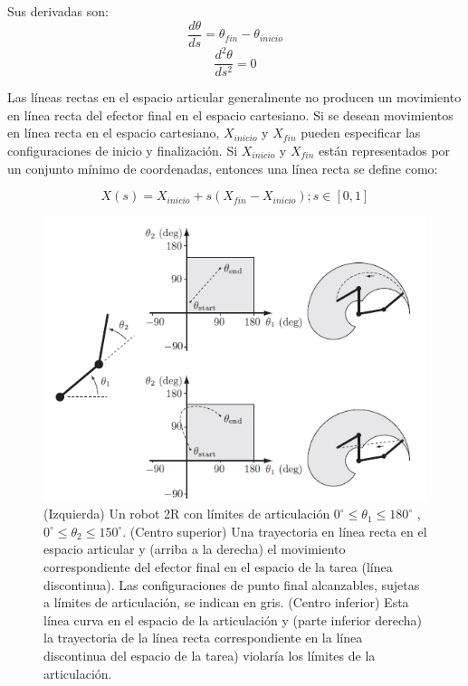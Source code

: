             Sus derivadas son:
            \begin{equation}
                \frac{d\theta}{ds}=\theta_{fin}-\theta_{inicio}
                \label{eq:cap4_tray_10}
             \end{equation}      
            \begin{equation}
                \frac{d^2\theta}{ds^2}=0
                \label{eq:cap4_tray_11}
             \end{equation}  
            
            Las líneas rectas en el espacio articular generalmente no producen un movimiento en línea recta del efector final en el espacio cartesiano. Si se desean movimientos en línea recta en el espacio cartesiano, $X_{inicio}$ y $X_{fin}$ pueden especificar las configuraciones de inicio y finalización. Si $X_{inicio}$ y $X_{fin}$ están representados por un conjunto mínimo de coordenadas, entonces una línea recta se define como:
            
            \begin{equation}
                X(s)= X_{inicio} + s(X_{fin}-X_{inicio}) ; s \in [0,1]
                \label{eq:cap4_tray_12}
             \end{equation}    
                
            \begin{figure}[htb]
                \centering
                \includegraphics[width=1\linewidth]{Main/Chapter4/Images4/cap4_tray_7.png}
                \caption{(Izquierda) Un robot 2R con límites de articulación $0^{\circ} \leq \theta_1 \leq 180^{\circ}$
, $0^{\circ} \leq \theta_2 \leq 150^{\circ}$. (Centro superior) Una trayectoria en línea recta en el espacio articular y (arriba a la derecha) el movimiento correspondiente del efector final en el espacio de la tarea (línea discontinua). Las configuraciones de punto final alcanzables, sujetas a límites de articulación, se indican en gris. (Centro inferior) Esta línea curva en el espacio de la articulación y (parte inferior derecha) la trayectoria de la línea recta correspondiente en la línea discontinua del espacio de la tarea) violaría los límites de la articulación. \cite{moder_robot}}
                \label{f:Cap4_tray_7}
            \end{figure}  
            
